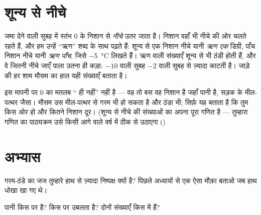 \section{शून्य से नीचे}

\begin{example}[जाड़े की संख्याएँ]\label{ex:g3:temperature-thermometers:belowzero}
जमा देने वाली सुबह में स्तंभ $0$ के निशान से \emph{नीचे} उतर जाता
है। निशान वहाँ भी नीचे की ओर चलते रहते हैं, और हम उन्हें ``ऋण'' शब्द
के साथ पढ़ते हैं: शून्य से एक निशान नीचे यानी \emph{ऋण एक} डिग्री,
पाँच निशान नीचे यानी \emph{ऋण पाँच}, जिसे \qty{-5}{\celsius} लिखते
हैं। ऋण वाली संख्याएँ शून्य से भी ठंडी होती हैं, और वे जितनी नीचे
जाएँ पाला उतना ही कड़ा: $-10$ वाली सुबह $-2$ वाली सुबह से ज़्यादा
काटती है। जाड़े की हर शाम मौसम का हाल यही संख्याएँ बताता है।
\end{example}

\begin{remark}[शून्य का मतलब ``कुछ नहीं'' नहीं है]\label{rem:g3:temperature-thermometers:zero}
इस मापनी पर $0$ का मतलब `` ही नहीं'' नहीं है --- वह तो बस वह
निशान है जहाँ पानी  है, सड़क के मील-पत्थर जैसा। मौसम उस
मील-पत्थर से गरम भी हो सकता है और ठंडा भी;  सिर्फ़ यह बताता है
कि तुम किस ओर हो और कितने निशान दूर। (शून्य से नीचे की संख्याओं का
अपना पूरा गणित है --- तुम्हारा गणित का पाठ्यक्रम उसे किसी आगे वाले
वर्ष में ठीक से उठाएगा।)
\end{remark}

\section{अभ्यास}

\begin{exercise}[$\star$]\label{exo:g3:temperature-thermometers:1}
गरम-ठंडे का जज तुम्हारे हाथ से ज़्यादा निष्पक्ष  क्यों है?
पिछले अध्यायों से एक ऐसा मौक़ा बताओ जब हाथ धोखा खा गए थे।
\end{exercise}

\begin{exercise}[$\star$]\label{exo:g3:temperature-thermometers:2}
पानी किस  पर  है? किस पर उबलता है? दोनों संख्याएँ किस 
में हैं?
\end{exercise}

